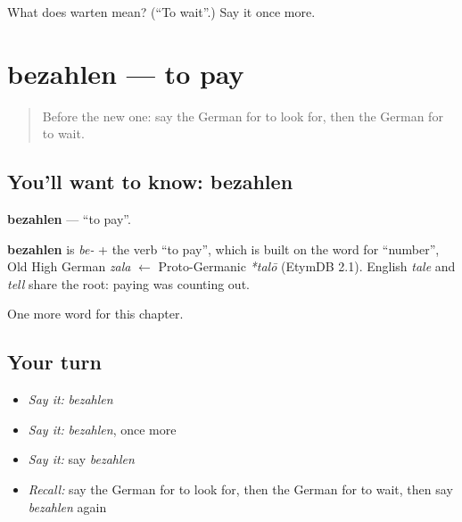 \begin{tcolorbox}[breakable,colback=teal!4,colframe=teal!35!black,title={Before you move on}]
What does warten mean? (\textquotedblleft{}To wait\textquotedblright{}.) Say it once more.
\end{tcolorbox}
\section[bezahlen]{bezahlen — to pay}

\label{lesson:GE-C65-bezahlen}



\begin{quote}
Before the new one: say the German for to look for, then the German for to wait.
\end{quote}

\subsection*{You'll want to know: bezahlen}
\textbf{bezahlen} — \textquotedblleft{}to pay\textquotedblright{}.

\begin{cousinweb}
\textbf{bezahlen} is \emph{be-} + the verb \textquotedblleft{}to pay\textquotedblright{}, which is built on the word for \textquotedblleft{}number\textquotedblright{}, Old High German \emph{zala} $\leftarrow$ Proto-Germanic \emph{*talō} (EtymDB 2.1). English \emph{tale} and \emph{tell} share the root: paying was counting out.
\end{cousinweb}

\begin{grammarlens}[title={What you've built}]
One more word for this chapter.
\end{grammarlens}

\subsection*{Your turn}
\begin{itemize}
\raggedright
  \item \emph{Say it:} \emph{bezahlen}
  \item \emph{Say it:} \emph{bezahlen}, once more
  \item \emph{Say it:} say \emph{bezahlen}
  \item \emph{Recall:} say the German for to look for, then the German for to wait, then say \emph{bezahlen} again
\end{itemize}

